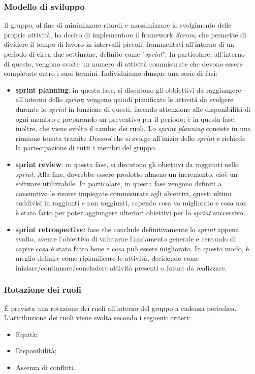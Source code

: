 \subsubsection{Modello di sviluppo}
Il gruppo, al fine di minimizzare ritardi e massimizzare lo svolgimento delle proprie attività, ha deciso
di implementare il framework \textit{Scrum}, che permette di dividere il tempo di lavoro in intervalli piccoli, frammentati all’interno di un periodo di circa due settimane, definito come "\textit{sprint}". In particolare, all’interno di
questo, vengono svolte un numero di attività commisurate che devono essere completate entro i suoi termini. Individuiamo dunque una serie di fasi:
\begin{itemize}
    \item \textbf{sprint planning}: in questa fase, si discutono gli obbiettivi da raggiungere all'interno dello \textit{sprint}; vengono quindi pianificate le attivitá da svolgere durante lo \textit{sprint} in funzione di questi, facendo attenzione alle disponibilitá di ogni membro e preparando un preventivo per il periodo; è in questa fase, inoltre, che viene svolto il cambio dei ruoli.
    Lo \textit{sprint planning} consiste in una riunione tenuta tramite \textit{Discord} che si svolge all'inizio dello \textit{sprint} e richiede la partecipazione di tutti i membri del gruppo.
    
    \item \textbf{sprint review}: in questa fase, si discutono gli obiettivi da raggiunti nello \textit{sprint}. Alla fine, dovrebbe essere prodotto almeno un incremento, cioè un software utilizzabile. In particolare, in questa fase vengono definiti a consuntivo le risorse impiegate commisurate agli obiettivi, questi ultimi suddivisi in raggiunti e non raggiunti, capendo cosa va migliorato e cosa non è stato fatto per poter aggiungere ulteriori obiettivi per lo \textit{sprint} successivo;
    
    \item \textbf{sprint retrospective}: fase che conclude definitivamente lo \textit{sprint} appena svolto, avente l'obiettivo di valutarne l'andamento generale e cercando di capire cosa è stato fatto bene e cosa può essere migliorato. In questo modo, è meglio definire come ripianificare le attività, decidendo come iniziare/continuare/concludere attività presenti o future da realizzare.
\end{itemize}

\subsubsection{Rotazione dei ruoli}
\'E prevista una rotazione dei ruoli all'interno del gruppo a cadenza periodica.
L’attribuzione dei ruoli viene svolta secondo i seguenti criteri:
\begin{itemize}
    \item Equità;
    \item Disponibilità;
    \item Assenza di conflitti.
\end{itemize}


